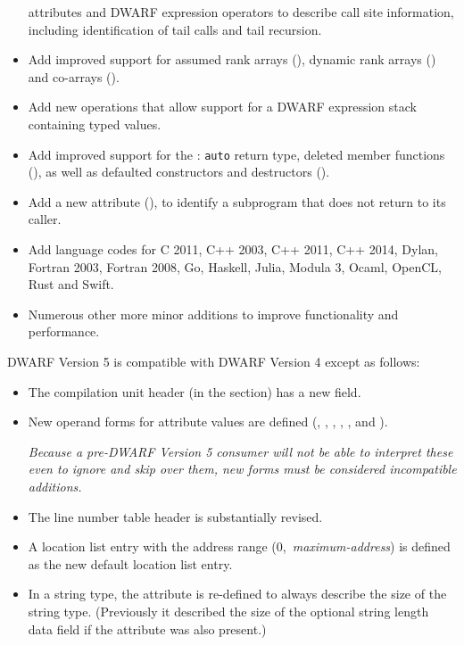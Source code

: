 \begin{itemize}
\bb\eb
attributes and DWARF expression operators to describe call site information, 
including identification of tail calls and tail recursion.
\bb\eb
\item Add improved support for  assumed rank arrays 
(\DWTAGgenericsubrangeNAME), dynamic rank arrays (\DWATrankNAME)
and co-arrays (\DWTAGcoarraytypeNAME{}).
\item Add
\bb
new operations that allow support for 
\eb
a DWARF expression stack containing typed values.
\item Add improved support for the :
\bb\eb
\texttt{auto} return type, deleted member functions (\DWATdeletedNAME), 
as well as defaulted constructors and destructors (\DWATdefaultedNAME).
\item Add a new attribute 
\bb
(\DWATnoreturnNAME{}), 
\eb
to identify 
a subprogram that does not return to its caller.
\item Add language codes for C 2011, C++ 2003, C++ 2011, C++ 2014,
Dylan, Fortran 2003, Fortran 2008, Go, Haskell, 
Julia, Modula 3, Ocaml, 
\bb
OpenCL, Rust 
\eb
and Swift.
\item Numerous other more minor additions to improve functionality
and performance.
\end{itemize}

DWARF Version 5 is compatible with DWARF Version 4 except as follows:
\begin{itemize}
\item The compilation unit header (in the \dotdebuginfo{} section) has
a new \HFNunittype{} field.
\item New operand forms for attribute values are defined 
(\DWFORMaddrxNAME, \DWFORMdatasixteenNAME, 
\bb
\DWFORMimplicitconstNAME, 
\eb
\DWFORMlinestrpNAME, 
\DWFORMrefsupNAME, \DWFORMstrpsupNAME{} and \DWFORMstrxNAME).

\textit{Because a pre-DWARF Version 5 consumer will not be able to interpret 
these even to ignore and skip over them, new forms must be 
considered incompatible additions.}
\item The line number table header 
\bb\eb 
is substantially revised.
\item A location list entry 
\bb\eb
with the address range \mbox{(0, \textit{maximum-address})} is defined 
as the new default location list entry.
\item In a string type,
\bb 
the \DWATbytesizeNAME{} attribute is re-defined 
\eb
to always describe the size of the string type. 
(Previously it described the size of the optional string length data 
field if the \DWATstringlengthNAME{} attribute was 
\bb
also 
\eb
present.)
\end{itemize}

